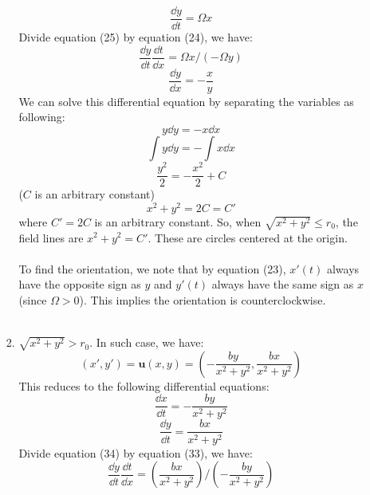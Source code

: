 \documentclass{article}
\begin{document}
\begin{enumerate}
\begin{enumerate}
\begin{enumerate}
\begin{equation}
    \frac{\dd y}{\dd t} = \Omega x
  \end{equation}
  Divide equation (25) by equation (24), we have:
  \begin{equation}
    \frac{\dd y}{\dd t} \frac{\dd t}{\dd x} = \Omega x/(-\Omega y)
  \end{equation}
  \begin{equation}
    \frac{\dd y}{\dd x} = -\frac{x}{y}
  \end{equation}
  We can solve this differential equation by separating the variables as following:
  \begin{equation}
    y \dd y = -x \dd x
  \end{equation}
  \begin{equation}
    \int y \dd y = -\int x \dd x
  \end{equation}
  \begin{equation}
    \frac{y^2}{2} = -\frac{x^2}{2} + C
  \end{equation}
  (\(C\) is an arbitrary constant)
  \begin{equation}
    x^2+y^2 =2C =C'
  \end{equation}
  where \(C'=2C\) is an arbitrary constant. So, when \(\sqrt{x^2+y^2} \le r_0\), the field lines are
  \(x^2+y^2 =C'\). These are circles centered at the origin. \\
  \\
  To find the orientation, we note that by equation (23), \(x'(t)\) always have the opposite sign as \(y\)
  and \(y'(t)\) always have the same sign as \(x\) (since \(\Omega >0\)). This implies the orientation is counterclockwise.\\
  \\
  \item \(\sqrt{x^2+y^2} > r_0\). In such case, we have:
  \begin{equation}
    (x', y') = \mathbf{u}(x, y) = \left(-\frac{by}{x^2+y^2}, \frac{bx}{x^2+y^2}\right)
  \end{equation}
  This reduces to the following differential equations:
  \begin{equation}
    \frac{\dd x}{\dd t} = -\frac{by}{x^2+y^2}
  \end{equation}
  \begin{equation}
    \frac{\dd y}{\dd t} = \frac{bx}{x^2+y^2}
  \end{equation}
  Divide equation (34) by equation (33), we have:
  \begin{equation}
    \frac{\dd y}{\dd t} \frac{\dd t}{\dd x} = \left( \frac{bx}{x^2+y^2}\right)/ \left(-\frac{by}{x^2+y^2}\right)

\end{equation}
\end{enumerate}
\end{enumerate}
\end{enumerate}
\end{document}

